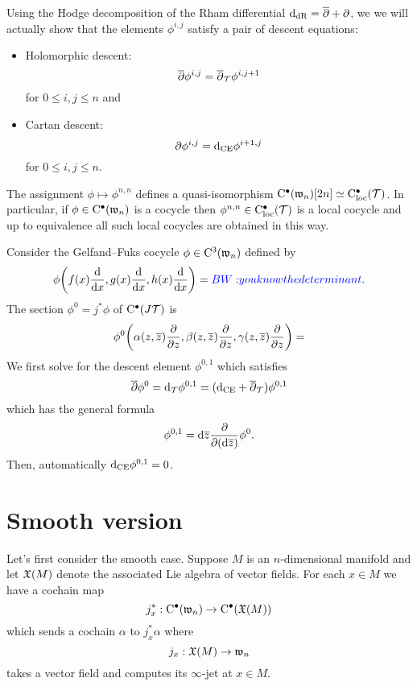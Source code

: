 \documentclass[11pt]{amsart}
\numberwithin{equation}{section}
\def\brian{\textcolor{blue}{BW: }\textcolor{blue}}
\begin{document}
Using the Hodge decomposition of the Rham differential ${\rm d}_{\rm dR} = \overline{\partial} + \partial$, we we will actually show that the elements $\phi^{i,j}$ satisfy a pair of descent equations:
\begin{itemize}
\item Holomorphic descent:
\[
\overline{\partial} \phi^{i,j} = \overline{\partial}_{\mathcal T} \phi^{i, j+1} 
\]
for $0 \leq i , j \leq n$ and
\item Cartan descent:
\[
\partial \phi^{i,j} = {\rm d}_{{\rm CE}} \phi^{i+1, j} 
\]
for $0 \leq i , j \leq n$. 
\end{itemize}

\begin{thm}
The assignment $\phi \mapsto \phi^{n,n}$ defines a quasi-isomorphism ${\rm C}^\bullet(\mathfrak w_n)[2n] \simeq {\rm C}_{\rm loc}^\bullet(\mathcal T)$.
In particular, if $\phi \in {\rm C}^\bullet(\mathfrak w_n)$ is a cocycle then $\phi^{n,n} \in {\rm C}_{\rm loc}^\bullet(\mathcal T)$ is a local cocycle and up to equivalence all such local cocycles are obtained in this way.
\end{thm}

\begin{eg}
Consider the Gelfand--Fuks cocycle $\phi \in {\rm C}^3(\mathfrak w_n)$ defined by
\[
\phi \bigg(f(x) \frac{\d}{\d x} , g(x) \frac{\d}{\d x} , h(x) \frac{\d}{\d x} \bigg) = \brian{you know the determinant} .
\]
The section $\phi^0 = j^* \phi$ of ${\rm C}^\bullet(J \mathcal T)$ is
\[
\phi^0 \bigg(\alpha(z,\overline{z}) \frac{\partial}{\partial z} , \beta(z,\overline{z}) \frac{\partial}{\partial z} , \gamma(z ,\overline{z}) \frac{\partial}{\partial z} \bigg) = 
\]
We first solve for the descent element $\phi^{0,1}$ which satisfies 
\[
\overline{\partial} \phi^0 = {\rm d}_{\mathcal T} \phi^{0,1} = ({\rm d}_{\rm CE} + \overline{\partial}_\mathcal T) \phi^{0,1} 
\]
which has the general formula
\[
\phi^{0,1} = {\rm d} \overline{z} \frac{\partial}{\partial ({\rm d} \overline{z})} \phi^0 .
\]
Then, automatically ${\rm d}_{\rm CE} \phi^{0,1} = 0$.

\end{eg}

\appendix

\section{Smooth version}

Let's first consider the smooth case. 
Suppose $M$ is an $n$-dimensional manifold and let $\mathfrak X(M)$ denote the associated Lie algebra of vector fields. 
For each $x \in M$ we have a cochain map
\[
j_x^* : {\rm C}^\bullet(\mathfrak w_n) \to {\rm C}^\bullet(\mathfrak X(M))
\]
which sends a cochain $\alpha$ to $j_x^* \alpha$ where 
\[
j_x : \mathfrak X(M) \to \mathfrak w_n
\]
takes a vector field and computes its $\infty$-jet at $x \in M$. 
\end{document}
